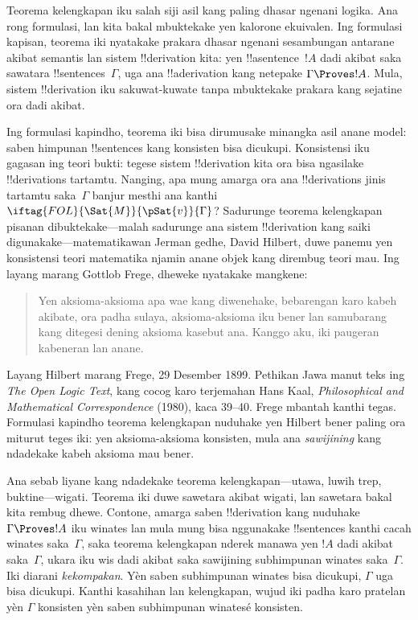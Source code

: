 \documentclass[../../../include/open-logic-section]{subfiles}
\begin{document}
      {}
      {}


Teorema kelengkapan iku salah siji asil kang paling dhasar ngenani
logika. Ana rong formulasi, lan kita bakal mbuktekake yen kalorone
ekuivalen. Ing formulasi kapisan, teorema iki nyatakake prakara dhasar
ngenani sesambungan antarane akibat semantis lan sistem
!!{derivation} kita: yen !!a{sentence}~$!A$ dadi akibat saka sawatara
!!{sentence}s~$\Gamma$, uga ana !!a{derivation} kang netepake
$\Gamma \Proves !A$. Mula, sistem !!{derivation} iku sakuwat-kuwate
tanpa mbuktekake prakara kang sejatine ora dadi akibat.

Ing formulasi kapindho, teorema iki bisa dirumusake minangka asil
anane model: saben himpunan !!{sentence}s kang konsisten bisa
dicukupi. Konsistensi iku gagasan ing teori bukti: tegese sistem
!!{derivation} kita ora bisa ngasilake !!{derivation}s tartamtu.
Nanging, apa mung amarga ora ana !!{derivation}s jinis tartamtu
saka~$\Gamma$ banjur mesthi ana
kanthi $\iftag{FOL}{\Sat{M}}{\pSat{v}}{\Gamma}$? Sadurunge
teorema kelengkapan pisanan dibuktekake---malah sadurunge ana sistem
!!{derivation} kang saiki digunakake---matematikawan Jerman gedhe,
David Hilbert, duwe panemu yen konsistensi teori matematika njamin
anane objek kang dirembug teori mau. Ing layang marang Gottlob Frege,
dheweke nyatakake mangkene:
\begin{quote}
  Yen aksioma-aksioma apa wae kang diwenehake, bebarengan karo kabeh
  akibate, ora padha sulaya, aksioma-aksioma iku bener lan samubarang
  kang ditegesi dening aksioma kasebut ana. Kanggo aku, iki paugeran
  kabeneran lan anane.
\end{quote}
Layang Hilbert marang Frege, 29 Desember 1899. Pethikan Jawa manut teks
ing \emph{The Open Logic Text}, kang cocog karo terjemahan Hans Kaal,
\emph{Philosophical and Mathematical Correspondence} (1980), kaca 39--40.
Frege mbantah kanthi tegas. Formulasi kapindho teorema kelengkapan
nuduhake yen Hilbert bener paling ora miturut teges iki: yen
aksioma-aksioma konsisten, mula ana \emph{sawijining}
 kang ndadekake kabeh
aksioma mau bener.

Ana sebab liyane kang ndadekake teorema kelengkapan---utawa, luwih
trep, buktine---wigati. Teorema iki duwe sawetara akibat wigati, lan
sawetara bakal kita rembug dhewe. Contone, amarga saben !!{derivation}
kang nuduhake $\Gamma \Proves !A$ iku winates lan mula mung bisa
nggunakake !!{sentence}s kanthi cacah winates saka~$\Gamma$, saka
teorema kelengkapan nderek manawa yen $!A$ dadi akibat saka~$\Gamma$,
ukara iku wis dadi akibat saka sawijining subhimpunan winates
saka~$\Gamma$. Iki diarani \emph{kekompakan}. Yèn saben subhimpunan winates bisa dicukupi,
$\Gamma$ uga bisa dicukupi. Kanthi kasahihan lan kelengkapan, wujud
iki padha karo pratelan yèn $\Gamma$ konsisten yèn saben subhimpunan
winatesé konsisten.
\end{document}
